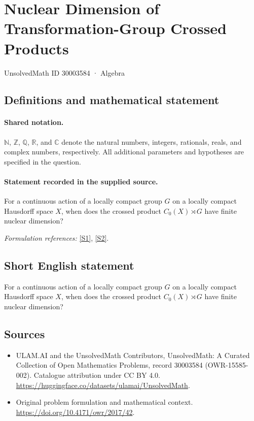 \documentclass[11pt]{article}
\newcommand{\sref}[2]{\hyperlink{source:#1:#2}{[S#2]}}
\begin{document}
\setcounter{section}{30003583}
\section{Nuclear Dimension of Transformation-Group Crossed Products}\label{30003584}
{\small UnsolvedMath ID 30003584 · Algebra}
\subsection{Definitions and mathematical statement}

\paragraph{Shared notation.}$\mathbb N$, $\mathbb Z$, $\mathbb Q$, $\mathbb R$, and $\mathbb C$ denote the natural numbers, integers, rationals, reals, and complex numbers, respectively. All additional parameters and hypotheses are specified in the question.


\paragraph{Statement recorded in the supplied source.}
For a continuous action of a locally compact group $G$ on a locally compact Hausdorff space $X$, when does the crossed product $C_0(X)\rtimes G$ have finite nuclear dimension?
\par\smallskip\textit{Formulation references:} \sref{30003584}{1}, \sref{30003584}{2}.
\subsection{Short English statement}
For a continuous action of a locally compact group $G$ on a locally compact Hausdorff space $X$, when does the crossed product $C_0(X)\rtimes G$ have finite nuclear dimension?
\subsection{Sources}
\begin{itemize}
\item[\hypertarget{source:30003584:1}{S1}] ULAM.AI and the UnsolvedMath Contributors, UnsolvedMath: A Curated Collection of Open Mathematics Problems, record 30003584 (OWR-15585-002). Catalogue attribution under CC BY 4.0.
\url{https://huggingface.co/datasets/ulamai/UnsolvedMath}.
\item[\hypertarget{source:30003584:2}{S2}] Original problem formulation and mathematical context.
\url{https://doi.org/10.4171/owr/2017/42}.
\end{itemize}
\label{end:30003584}
\end{document}
